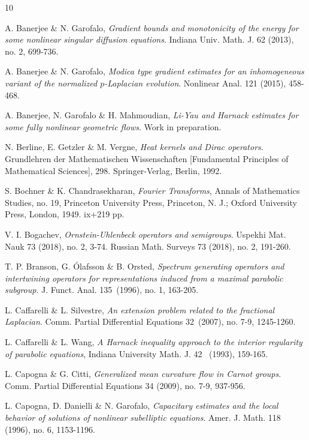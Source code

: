 \documentclass[11pt,a4paper]{amsart}
\numberwithin{equation}{section}
\numberwithin{equation}{section}
\begin{document}
\begin{thebibliography}{10}

A. Banerjee \& N. Garofalo, \emph{Gradient bounds and monotonicity of the energy for some nonlinear singular diffusion equations}.
Indiana Univ. Math. J. 62 (2013), no. 2, 699-736.

A. Banerjee \& N. Garofalo, \emph{Modica type gradient estimates for an inhomogeneous variant of the normalized $p$-Laplacian evolution}.
Nonlinear Anal. 121 (2015), 458-468.

A. Banerjee, N. Garofalo \& H. Mahmoudian, \emph{Li-Yau and Harnack estimates for some fully nonlinear geometric flows}. Work in preparation.

N. Berline, E. Getzler \& M. Vergne, \emph{Heat kernels and Dirac operators}. Grundlehren der Mathematischen Wissenschaften [Fundamental Principles of Mathematical Sciences], 298. Springer-Verlag, Berlin, 1992.


S. Bochner \& K. Chandrasekharan, \emph{Fourier Transforms}, Annals of Mathematics Studies, no. 19, Princeton University Press, Princeton, N. J.; Oxford University Press, London, 1949. ix+219 pp.

V. I. Bogachev, \emph{Ornstein-Uhlenbeck operators and semigroups}.
Uspekhi Mat. Nauk 73 (2018), no. 2, 3-74.
Russian Math. Surveys 73 (2018), no. 2, 191-260.

T. P. Branson, G. \'{O}lafsson \& B. Orsted, \emph{Spectrum generating operators and intertwining operators for representations induced from a maximal parabolic subgroup}. J. Funct. Anal. 135~(1996), no. 1, 163-205.

L. Caffarelli \& L. Silvestre, \emph{An extension problem related to the fractional Laplacian}.
Comm. Partial Differential Equations 32~(2007), no. 7-9, 1245-1260.


L.  Caffarelli \& L. Wang, \emph{A Harnack inequality approach to the interior  regularity of parabolic  equations},  Indiana University  Math.  J. 42 ~(1993), 159-165.

L. Capogna \& G. Citti, \emph{
Generalized mean curvature flow in Carnot groups}.
Comm. Partial Differential Equations 34 (2009), no. 7-9, 937-956.

L. Capogna, D. Danielli \& N. Garofalo, \emph{Capacitary estimates and the local behavior of solutions of nonlinear subelliptic equations}. Amer. J. Math. 118 (1996), no. 6, 1153-1196.


\end{thebibliography}
\end{document}
